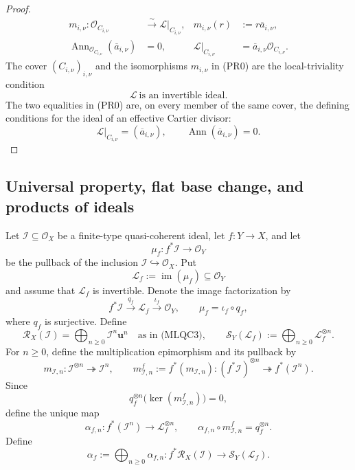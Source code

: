 \begin{proof}
\[\begin{aligned}
    m_{i,\nu}\colon\mathcal O_{C_{i,\nu}}
      &\xrightarrow{\ \sim\ }\mathcal L|_{C_{i,\nu}},&
    m_{i,\nu}(r)&:=r\overline a_{i,\nu},\\
    \operatorname{Ann}_{\mathcal O_{C_{i,\nu}}}
      (\overline a_{i,\nu})&=0,&
    \mathcal L|_{C_{i,\nu}}&=
      \overline a_{i,\nu}\mathcal O_{C_{i,\nu}}.
  \end{aligned}                                                \tag{PR0}
  \]
  The cover $(C_{i,\nu})_{i,\nu}$ and the isomorphisms $m_{i,\nu}$ in
  (PR0) are the local-triviality condition
  \[
    \mathcal L\ \text{is an invertible ideal}.
  \]
  The two equalities in (PR0) are, on every member of the same cover, the
  defining conditions for the ideal of an effective Cartier divisor:
  \[
    \mathcal L|_{C_{i,\nu}}
      =(\overline a_{i,\nu}),\qquad
    \operatorname{Ann}(\overline a_{i,\nu})=0.
  \]
\end{proof}

\subsection{Universal property, flat base change, and products of ideals}

\begin{definition}
  \label{def:nagata-blowup-universal-graded-map}

  Let $\mathcal I\subseteq\mathcal O_X$ be a finite-type quasi-coherent ideal,
  let $f\colon Y\to X$, and let
  \[
    \mu_f\colon f^*\mathcal I\longrightarrow\mathcal O_Y
  \]
  be the pullback of the inclusion
  $\mathcal I\hookrightarrow\mathcal O_X$.  Put
  \[
    \mathcal L_f:=\operatorname{im}(\mu_f)\subseteq\mathcal O_Y
  \]
  and assume that $\mathcal L_f$ is invertible.  Denote the image
  factorization by
  \[
    f^*\mathcal I\xrightarrow{q_f}\mathcal L_f
      \xrightarrow{\iota_f}\mathcal O_Y,
    \qquad \mu_f=\iota_f\circ q_f,
  \]
  where $q_f$ is surjective.  Define
  \[
    \mathcal R_X(\mathcal I)
      =\bigoplus_{n\ge0}\mathcal I^n\mathbf u^n
      \quad\text{as in (MLQC3)},
    \qquad
    \mathcal S_Y(\mathcal L_f):=
      \bigoplus_{n\ge0}\mathcal L_f^{\otimes n}.
  \]
  For $n\ge0$, define the multiplication epimorphism and its pullback by
  \[
    m_{\mathcal I,n}\colon\mathcal I^{\otimes n}
      \twoheadrightarrow\mathcal I^n,
    \qquad
    m^f_{\mathcal I,n}:=f^*(m_{\mathcal I,n})\colon
      (f^*\mathcal I)^{\otimes n}\twoheadrightarrow f^*(\mathcal I^n).
  \]
  Since
  \[
    q_f^{\otimes n}\bigl(\ker(m^f_{\mathcal I,n})\bigr)=0,
  \]
  define the unique map
  \[
    \alpha_{f,n}\colon f^*(\mathcal I^n)
      \longrightarrow\mathcal L_f^{\otimes n},
    \qquad
    \alpha_{f,n}\circ m^f_{\mathcal I,n}=q_f^{\otimes n}.
  \]
  Define
  \[
    \alpha_f:=\bigoplus_{n\ge0}\alpha_{f,n}\colon
      f^*\mathcal R_X(\mathcal I)
      \longrightarrow\mathcal S_Y(\mathcal L_f).
  \]
\end{definition}

